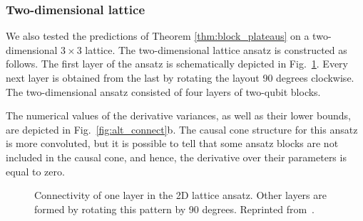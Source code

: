 \subsubsection{Two-dimensional lattice}

We also tested the predictions of Theorem \ref{thm:block_plateaus} on a two-dimensional $3 \times 3$ lattice. The two-dimensional lattice ansatz is constructed as follows. The first layer of the ansatz is schematically depicted in Fig.~\ref{fig:2d_ansatz_scheme}. Every next layer is obtained from the last by rotating the layout 90 degrees clockwise. The two-dimensional ansatz consisted of four layers of two-qubit blocks. 

The numerical values of the derivative variances, as well as their lower bounds, are depicted in Fig.~\ref{fig:alt_connect}b. The causal cone structure for this ansatz is more convoluted, but it is possible to tell that some ansatz blocks are not included in the causal cone, and hence, the derivative over their parameters is equal to zero. 

\begin{figure}
    \centering
    \caption{Connectivity of one layer in the 2D lattice ansatz. Other layers are formed by rotating this pattern by 90 degrees. Reprinted from~\cite{uvarov_barren_2021}.}
    \label{fig:2d_ansatz_scheme}
\end{figure}






